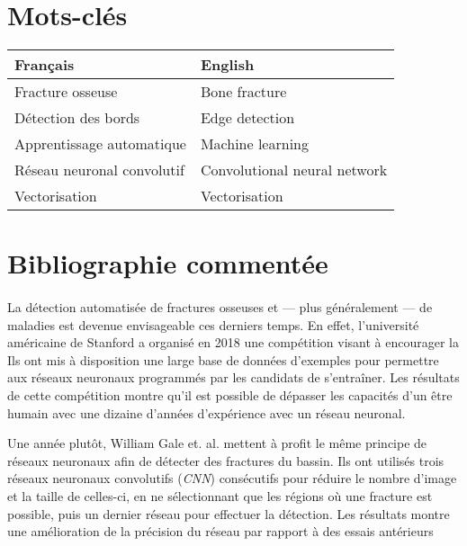 \documentclass[a4paper]{article}
\begin{document}
\section{Mots-clés}

\begin{table}[h]
    \centering
    \label{tab:keywords}
    \begin{tabular}{l|l}
    Français & English \\\hline
    Fracture osseuse & Bone fracture \\
    Détection des bords & Edge detection \\
    Apprentissage automatique & Machine learning \\
    Réseau neuronal convolutif & Convolutional neural network  \\
    Vectorisation & Vectorisation \\
    \end{tabular}
\end{table}

\section{Bibliographie commentée}

\paragraph{}

La détection automatisée de fractures osseuses et --- plus généralement --- de maladies est devenue envisageable ces
derniers temps. En effet, l'université américaine de Stanford a organisé en 2018 une compétition visant à encourager la
Ils ont mis à disposition une large base de données d'exemples pour permettre aux réseaux neuronaux programmés par les
candidats de s'entraîner.  Les résultats de cette compétition montre qu'il est possible de dépasser les capacités d'un
être humain avec une dizaine d'années d'expérience avec un réseau neuronal\cite{mura-competition}.

Une année plutôt, William Gale et. al. mettent à profit le même principe de réseaux neuronaux afin de détecter des
fractures du bassin\cite{detect-hip}.  Ils ont utilisés trois réseaux neuronaux convolutifs (\emph{CNN}) consécutifs
pour réduire le nombre d'image et la taille de celles-ci, en ne sélectionnant que les régions où une fracture est
possible, puis un dernier réseau pour effectuer la détection. Les résultats montre une amélioration de la précision du
réseau par rapport à des essais antérieurs
\end{document}
